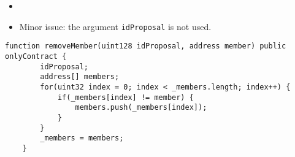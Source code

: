 \begin{itemize}
\item {}
\item Minor issue: the argument {\tt idProposal} is not used.
\end{itemize}

\begin{lstlisting}[firstnumber=30]
    function removeMember(uint128 idProposal, address member) public onlyContract {
        idProposal;
        address[] members;
        for(uint32 index = 0; index < _members.length; index++) {
            if(_members[index] != member) {
                members.push(_members[index]);
            }
        }
        _members = members;
    }
\end{lstlisting}
